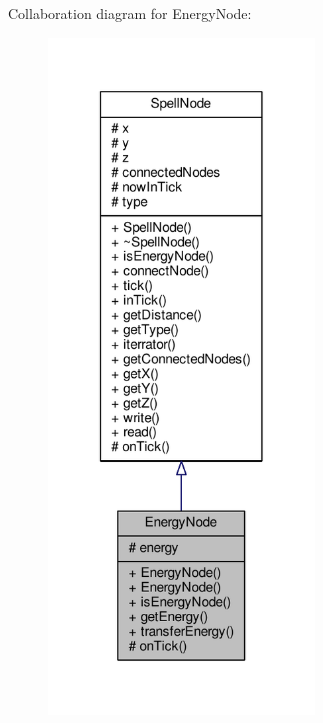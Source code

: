 Collaboration diagram for Energy\-Node\-:
\nopagebreak
\begin{figure}[H]
\begin{center}
\leavevmode
\includegraphics[width=200pt]{class_energy_node__coll__graph}
\end{center}
\end{figure}
